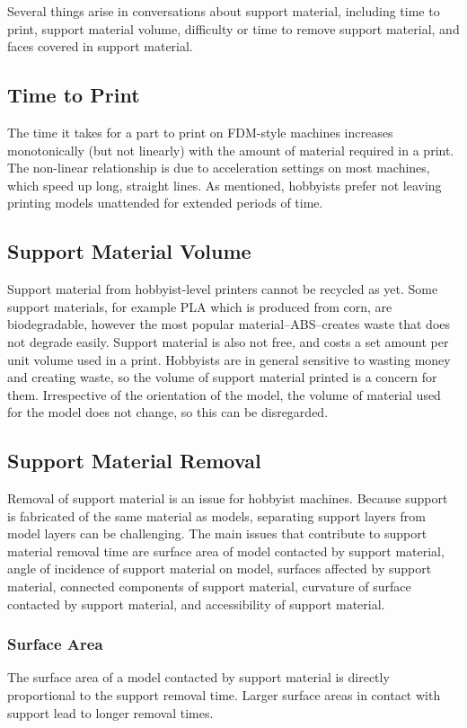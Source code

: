 \documentclass{sigchi}
\begin{document}
Several things arise in conversations about support material, including time to print, support material volume, difficulty or time to remove support material, and faces covered in support material.

\subsection{Time to Print}
The time it takes for a part to print on FDM-style machines increases monotonically (but not linearly) with the amount of material required in a print.  The non-linear relationship is due to acceleration settings on most machines, which speed up long, straight lines.  As mentioned, hobbyists prefer not leaving printing models unattended for extended periods of time.

\subsection{Support Material Volume}
Support material from hobbyist-level printers cannot be recycled as yet.  Some support materials, for example PLA which is produced from corn, are biodegradable, however the most popular material--ABS--creates waste that does not degrade easily.  Support material is also not free, and costs a set amount per unit volume used in a print.  Hobbyists are in general sensitive to wasting money and creating waste, so the volume of support material printed is a concern for them.  Irrespective of the orientation of the model, the volume of material used for the model does not change, so this can be disregarded.

\subsection{Support Material Removal}
Removal of support material is an issue for hobbyist machines.  Because support is fabricated of the same material as models, separating support layers from model layers can be challenging.  The main issues that contribute to support material removal time are surface area of model contacted by support material, angle of incidence of support material on model, surfaces affected by support material, connected components of support material, curvature of surface contacted by support material, and accessibility of support material.

\subsubsection{Surface Area}
The surface area of a model contacted by support material is directly proportional to the support removal time.  Larger surface areas in contact with support lead to longer removal times.
\end{document}
